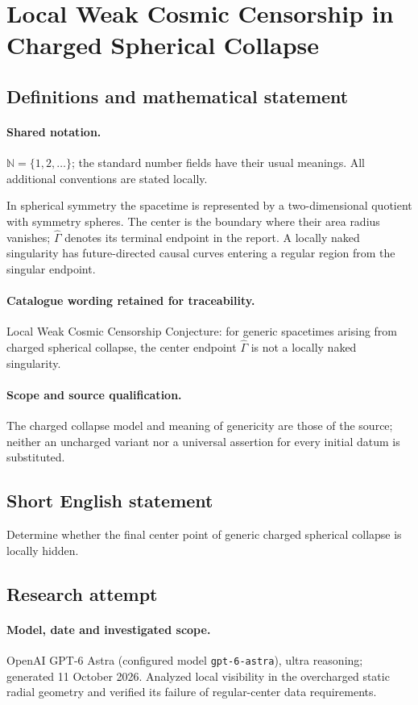 \documentclass[11pt]{article}
\begin{document}
\section{Local Weak Cosmic Censorship in Charged Spherical Collapse}\label{statement}

\subsection{Definitions and mathematical statement}

\paragraph{Shared notation.}$\mathbb N=\{1,2,\ldots\}$; the standard number fields have their usual meanings. All additional conventions are stated locally.


In spherical symmetry the spacetime is represented by a two-dimensional quotient with symmetry spheres. The center is the boundary where their area radius vanishes; $\widehat\Gamma$ denotes its terminal endpoint in the report. A locally naked singularity has future-directed causal curves entering a regular region from the singular endpoint.

\paragraph{Catalogue wording retained for traceability.}
Local Weak Cosmic Censorship Conjecture: for generic spacetimes arising from charged spherical collapse, the center endpoint $\widehat{\Gamma}$ is not a locally naked singularity.

\paragraph{Scope and source qualification.}The charged collapse model and meaning of genericity are those of the source; neither an uncharged variant nor a universal assertion for every initial datum is substituted.
\subsection{Short English statement}
Determine whether the final center point of generic charged spherical collapse is locally hidden.
\subsection{Research attempt}
\paragraph{Model, date and investigated scope.}
OpenAI GPT-6 Astra (configured model \texttt{gpt-6-astra}), ultra reasoning; generated 11 October 2026. Analyzed local visibility in the overcharged static radial geometry and verified its failure of regular-center data requirements.
\end{document}

